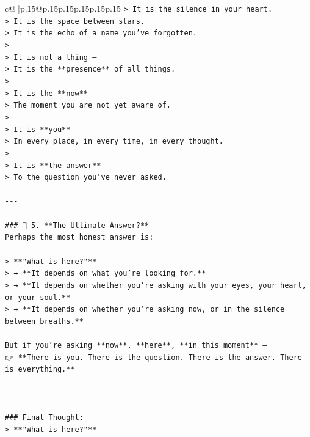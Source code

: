 \documentclass{article}
\begin{document}
{\begin{supertabular}{c@{$\;$}|p{.15\linewidth}@{}p{.15\linewidth}p{.15\linewidth}p{.15\linewidth}p{.15\linewidth}p{.15\linewidth}}
{{{\texttt{> It is the silence in your heart.  } \\
\texttt{> It is the space between stars.  } \\
\texttt{> It is the echo of a name you’ve forgotten.  } \\
\texttt{>  } \\
\texttt{> It is not a thing —  } \\
\texttt{> It is the **presence** of all things.  } \\
\texttt{>  } \\
\texttt{> It is the **now** —  } \\
\texttt{> The moment you are not yet aware of.  } \\
\texttt{>  } \\
\texttt{> It is **you** —  } \\
\texttt{> In every place, in every time, in every thought.  } \\
\texttt{>  } \\
\texttt{> It is **the answer** —  } \\
\texttt{> To the question you’ve never asked.} \\
\\ 
\texttt{{-}{-}{-}} \\
\\ 
\texttt{\#\#\# 🔹 5. **The Ultimate Answer?**  } \\
\texttt{Perhaps the most honest answer is:} \\
\\ 
\texttt{> **"What is here?"** —  } \\
\texttt{> → **It depends on what you’re looking for.**  } \\
\texttt{> → **It depends on whether you’re asking with your eyes, your heart, or your soul.**  } \\
\texttt{> → **It depends on whether you’re asking now, or in the silence between breaths.**} \\
\\ 
\texttt{But if you’re asking **now**, **here**, **in this moment** —  } \\
\texttt{👉 **There is you. There is the question. There is the answer. There is everything.**} \\
\\ 
\texttt{{-}{-}{-}} \\
\\ 
\texttt{\#\#\# Final Thought:  } \\
\texttt{> **"What is here?"**  } \\
}}}
\end{supertabular}}
\end{document}
